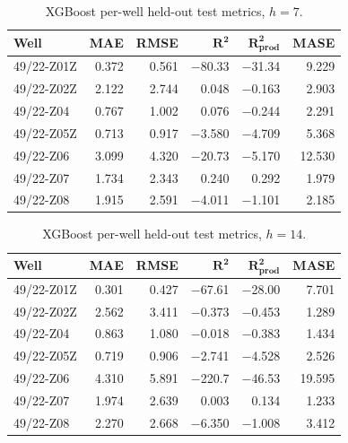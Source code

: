 \documentclass[10pt]{article}
\begin{document}
\begin{table}[ht]
\centering
\caption{XGBoost per-well held-out test metrics, $h{=}7$.}
\label{tab:xgboost_perwell_h7}
\small
\begin{tabular}{@{}l rrrrr @{}}
\toprule
\textbf{Well} & \textbf{MAE} & \textbf{RMSE} & $\boldsymbol{R^2}$ & $\boldsymbol{R^2_\text{prod}}$ & \textbf{MASE} \\
\midrule
49/22-Z01Z & 0.372 &  0.561 & $-$80.33 & $-$31.34 &  9.229 \\
49/22-Z02Z & 2.122 &  2.744 &    0.048 &   $-$0.163 &  2.903 \\
49/22-Z04  & 0.767 &  1.002 &    0.076 &   $-$0.244 &  2.291 \\
49/22-Z05Z & 0.713 &  0.917 &   $-$3.580 &   $-$4.709 &  5.368 \\
49/22-Z06  & 3.099 &  4.320 &  $-$20.73 &   $-$5.170 & 12.530 \\
49/22-Z07  & 1.734 &  2.343 &    0.240 &    0.292 &  1.979 \\
49/22-Z08  & 1.915 &  2.591 &   $-$4.011 &   $-$1.101 &  2.185 \\
\bottomrule
\end{tabular}
\end{table}


\begin{table}[ht]
\centering
\caption{XGBoost per-well held-out test metrics, $h{=}14$.}
\label{tab:xgboost_perwell_h14}
\small
\begin{tabular}{@{}l rrrrr @{}}
\toprule
\textbf{Well} & \textbf{MAE} & \textbf{RMSE} & $\boldsymbol{R^2}$ & $\boldsymbol{R^2_\text{prod}}$ & \textbf{MASE} \\
\midrule
49/22-Z01Z & 0.301 &   0.427 & $-$67.61 & $-$28.00 &  7.701 \\
49/22-Z02Z & 2.562 &   3.411 &   $-$0.373 &   $-$0.453 &  1.289 \\
49/22-Z04  & 0.863 &   1.080 &   $-$0.018 &   $-$0.383 &  1.434 \\
49/22-Z05Z & 0.719 &   0.906 &   $-$2.741 &   $-$4.528 &  2.526 \\
49/22-Z06  & 4.310 &   5.891 & $-$220.7  & $-$46.53 & 19.595 \\
49/22-Z07  & 1.974 &   2.639 &    0.003 &    0.134 &  1.233 \\
49/22-Z08  & 2.270 &   2.668 &   $-$6.350 &   $-$1.008 &  3.412 \\
\bottomrule
\end{tabular}
\end{table}
\end{document}
